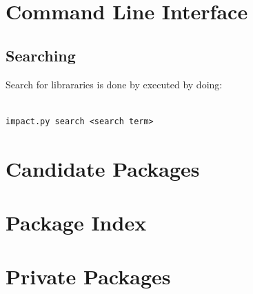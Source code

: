 \documentclass[11pt,a4paper,twocolumn]{article}
\begin{document}
\section{Command Line Interface}




\subsection{Searching} %
\label{cmd:search}

Search for librararies is done by executed by doing:
\lstset{language=bash}
\begin{lstlisting}[frame=shadowbox]  % Start your code-block

impact.py search <search term>
\end{lstlisting}

\section{Candidate Packages}





\section{Package Index}




\section{Private Packages}

\end{document}

